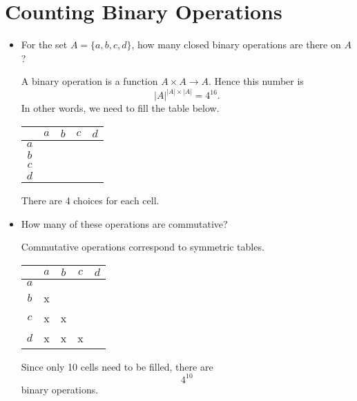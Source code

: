 \documentclass[11pt]{article}
\begin{document}
    \pagebreak

    \section{Counting Binary Operations}

    \begin{itemize}
        \item For the set \(A = \{a,b,c,d\}\), how many closed binary operations are there on $A$? 

        \vspace{1em}
    
        A binary operation is a function \(A \times A \rightarrow A\). Hence this number is \[|A|^{|A| \times |A|} = 4^{16}.\] In other words, we need to fill the table below.
        \begin{center}
            \begin{tabular}{| c | c | c | c | c |} \hline
                     & $a$ & $b$ & $c$ & $d$ \\ \hline
                 $a$ &     &     &     &     \\ \hline
                 $b$ &     &     &     &     \\ \hline
                 $c$ &     &     &     &     \\ \hline
                 $d$ &     &     &     &     \\ \hline
            \end{tabular}
        \end{center}
        There are 4 choices for each cell.

        \item How many of these operations are commutative?
        
        \vspace{1em}

        Commutative operations correspond to symmetric tables.
        \begin{center}
            \begin{tabular}{| c | c | c | c | c |} \hline
                     & $a$ & $b$ & $c$ & $d$ \\ \hline
                 $a$ &     &     &     &     \\ \hline
                 $b$ &  x  &     &     &     \\ \hline
                 $c$ &  x  &  x  &     &     \\ \hline
                 $d$ &  x  &  x  &  x  &     \\ \hline
            \end{tabular}
        \end{center}
        Since only 10 cells need to be filled, there are \[4^{10}\] binary operations.


\end{itemize}
\end{document}

